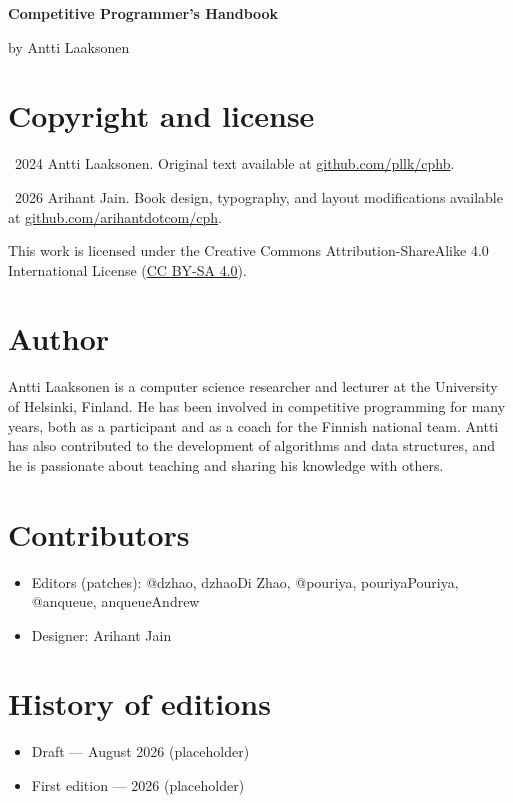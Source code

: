 \thispagestyle{empty}

\begin{center}
{\sffamily\bfseries\Huge Competitive Programmer's Handbook\par}
\vspace{0.4em}
{\Large by Antti Laaksonen\par}
\end{center}

\vspace{1.5em}

\section*{Copyright and license}
\textcopyright\ 2024 Antti Laaksonen. Original text available at
\href{https://github.com/pllk/cphb/}{github.com/pllk/cphb}.

\textcopyright\ 2026 Arihant Jain. Book design, typography, and layout
modifications available at
\href{https://github.com/arihantdotcom/cph}{github.com/arihantdotcom/cph}.

This work is licensed under the Creative Commons Attribution-ShareAlike 4.0
International License
(\href{https://creativecommons.org/licenses/by-sa/4.0/}{CC BY-SA 4.0}).


\section*{Author}
Antti Laaksonen is a computer science researcher and lecturer at the University of Helsinki, Finland.
He has been involved in competitive programming for many years, both as a participant and as a coach for the Finnish national team. 
Antti has also contributed to the development of algorithms and data structures, and he is passionate about teaching and sharing his knowledge with others.
\section*{Contributors}
\begin{itemize}[nosep,leftmargin=*]
\item Editors (patches): @dzhao, dzhaoDi Zhao, @pouriya, pouriyaPouriya, @anqueue, anqueueAndrew
\item Designer: Arihant Jain
\end{itemize}

\section*{History of editions}
\begin{itemize}[nosep,leftmargin=*]
\item Draft --- August 2026 (placeholder)
\item First edition --- 2026 (placeholder)
\end{itemize}

